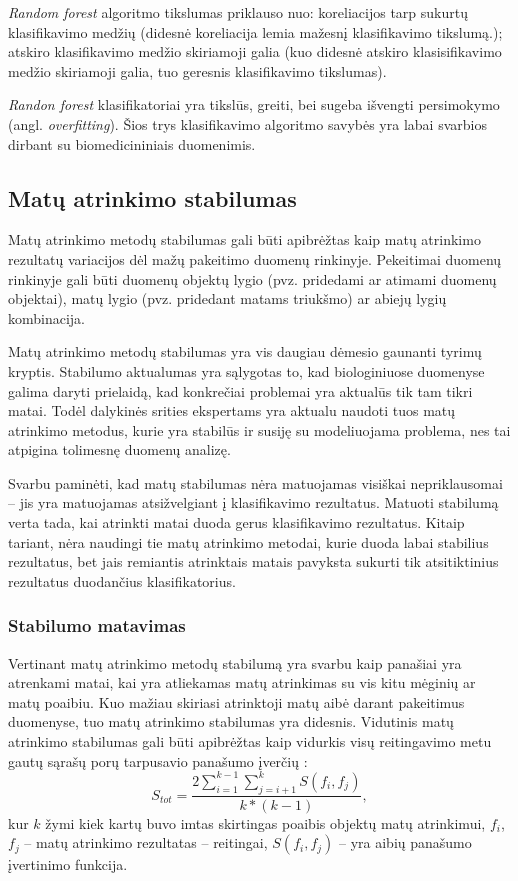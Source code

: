 \textit{Random forest} algoritmo tikslumas priklauso nuo: koreliacijos tarp sukurtų klasifikavimo medžių (didesnė koreliacija lemia mažesnį klasifikavimo tikslumą.); atskiro klasifikavimo medžio skiriamoji galia (kuo didesnė atskiro klasisifikavimo medžio skiriamoji galia, tuo geresnis klasifikavimo tikslumas).

\textit{Randon forest} klasifikatoriai yra tikslūs, greiti, bei sugeba išvengti persimokymo (angl. \textit{overfitting}). Šios trys klasifikavimo algoritmo savybės yra labai svarbios dirbant su biomedicininiais duomenimis. 

\subsection{Matų atrinkimo stabilumas}

Matų atrinkimo metodų stabilumas gali būti apibrėžtas kaip matų atrinkimo rezultatų variacijos dėl mažų pakeitimo duomenų rinkinyje. Pekeitimai duomenų rinkinyje gali būti duomenų objektų lygio (pvz. pridedami ar atimami duomenų objektai), matų lygio (pvz. pridedant matams triukšmo) ar abiejų lygių kombinacija.

Matų atrinkimo metodų stabilumas yra vis daugiau dėmesio gaunanti tyrimų kryptis. Stabilumo aktualumas yra sąlygotas to, kad biologiniuose duomenyse galima daryti prielaidą, kad konkrečiai problemai yra aktualūs tik tam tikri matai. Todėl dalykinės srities ekspertams yra aktualu naudoti tuos matų atrinkimo metodus, kurie yra stabilūs ir susiję su modeliuojama problema, nes tai atpigina tolimesnę duomenų analizę. 

Svarbu paminėti, kad matų stabilumas nėra matuojamas visiškai nepriklausomai -- jis yra matuojamas atsižvelgiant į klasifikavimo rezultatus. Matuoti stabilumą verta tada, kai atrinkti matai duoda gerus klasifikavimo rezultatus. Kitaip tariant, nėra naudingi tie matų atrinkimo metodai, kurie duoda labai stabilius rezultatus, bet jais remiantis atrinktais matais pavyksta sukurti tik atsitiktinius rezultatus duodančius klasifikatorius.

\subsubsection{Stabilumo matavimas}

Vertinant matų atrinkimo metodų stabilumą yra svarbu kaip panašiai yra atrenkami matai, kai yra atliekamas matų atrinkimas su vis kitu mėginių ar matų poaibiu. Kuo mažiau skiriasi atrinktoji matų aibė darant pakeitimus duomenyse, tuo matų atrinkimo stabilumas yra didesnis. Vidutinis matų atrinkimo stabilumas gali būti apibrėžtas kaip vidurkis visų reitingavimo metu gautų sąrašų porų tarpusavio panašumo įverčių \cite{kalousis2007stability}:
\begin{equation}
 S_{tot}=\frac{2\sum_{i=1}^{k-1}\sum_{j=i+1}^{k} S(f_i, f_j)}{k*(k-1)},
\end{equation} 
kur $k$ žymi kiek kartų buvo imtas skirtingas poaibis objektų matų atrinkimui,
$f_i$, $f_j$ -- matų atrinkimo rezultatas -- reitingai, 
$S(f_i, f_j)$ -- yra aibių panašumo įvertinimo funkcija.

